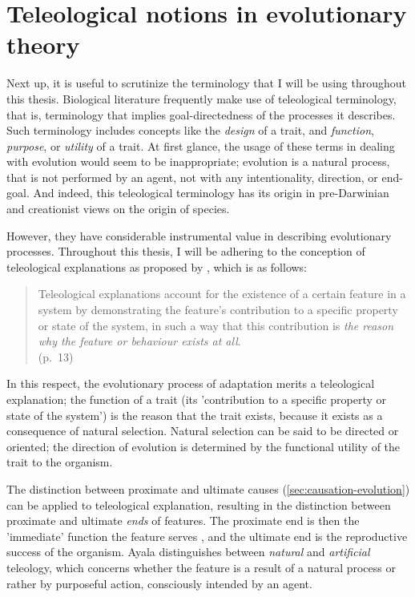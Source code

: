 \section{Teleological notions in evolutionary theory}
\label{sec:teleology}

Next up, it is useful to scrutinize the terminology that I will be using throughout this thesis.
Biological literature frequently make use of teleological terminology, that is, terminology that implies goal-directedness of the processes it describes. Such terminology includes concepts like the \emph{design} of a trait, and \emph{function}, \emph{purpose}, or \emph{utility} of a trait.
At first glance, the usage of these terms in dealing with evolution would seem to be inappropriate; evolution is a natural process, that is not performed by an agent, not with any intentionality, direction, or end-goal. And indeed, this teleological terminology has its origin in pre-Darwinian and creationist views on the origin of species.

However, they have considerable instrumental value in describing evolutionary processes. Throughout this thesis, I will be adhering to the conception of teleological explanations as proposed by \citet{Ayala99}, which is as follows:
\begin{quote}
    Teleological explanations account for the existence of a certain feature in a system by demonstrating the feature’s contribution to a specific property or state of the system, in such a way that this contribution is \emph{the reason why the feature or behaviour exists at all}.
    \\ \hfill
    (p.~13)
\end{quote}
In this respect, the evolutionary process of adaptation merits a teleological explanation; the function of a trait (its 'contribution to a specific property or state of the system') is the reason that the trait exists, because it exists as a consequence of natural selection.
Natural selection can be said to be directed or oriented; the direction of evolution is determined by the functional utility of the trait to the organism.

The distinction between proximate and ultimate causes (\cref{sec:causation-evolution}) can be applied to teleological explanation, resulting in the distinction between proximate and ultimate \emph{ends} of features. The proximate end is then the 'immediate' function the feature serves , and the ultimate end is the reproductive success of the organism.
 Ayala distinguishes between \emph{natural} and \emph{artificial} teleology, which concerns whether the feature is a result of a natural process or rather by purposeful action, consciously intended by an agent.

